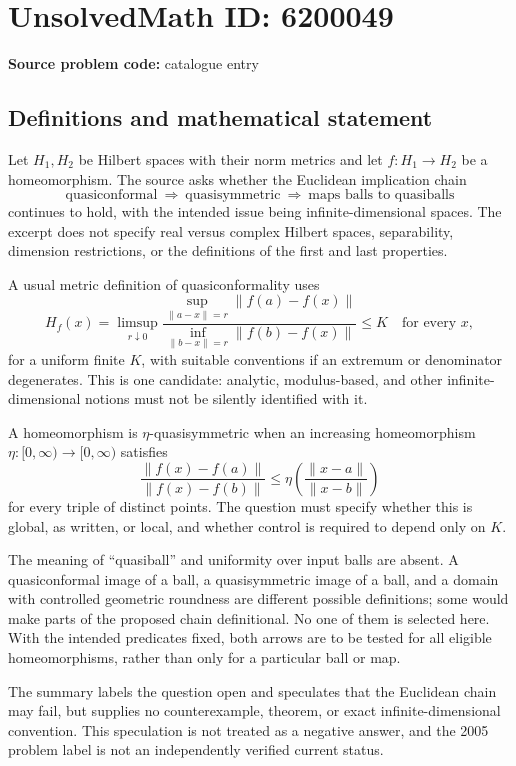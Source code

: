 \documentclass[11pt]{article}
\begin{document}
\section*{UnsolvedMath ID: 6200049}
\textbf{Source problem code:} catalogue entry
\subsection{Definitions and mathematical statement}
Let \(H_1,H_2\) be Hilbert spaces with their norm metrics and let \(f:H_1\to H_2\) be a homeomorphism. The source asks whether the Euclidean implication chain
\[
 \text{quasiconformal}\ \Longrightarrow\ \text{quasisymmetric}
 \ \Longrightarrow\ \text{maps balls to quasiballs}
\]
continues to hold, with the intended issue being infinite-dimensional spaces. The excerpt does not specify real versus complex Hilbert spaces, separability, dimension restrictions, or the definitions of the first and last properties.

A usual metric definition of quasiconformality uses
\[
 H_f(x)=\limsup_{r\downarrow0}
 \frac{\sup_{\|a-x\|=r}\|f(a)-f(x)\|}
 {\inf_{\|b-x\|=r}\|f(b)-f(x)\|}
 \le K\quad\text{for every }x,
\]
for a uniform finite \(K\), with suitable conventions if an extremum or denominator degenerates. This is one candidate: analytic, modulus-based, and other infinite-dimensional notions must not be silently identified with it.

A homeomorphism is \(\eta\)-quasisymmetric when an increasing homeomorphism \(\eta:[0,\infty)\to[0,\infty)\) satisfies
\[
 \frac{\|f(x)-f(a)\|}{\|f(x)-f(b)\|}
 \le\eta\left(\frac{\|x-a\|}{\|x-b\|}\right)
\]
for every triple of distinct points. The question must specify whether this is global, as written, or local, and whether control is required to depend only on \(K\).

The meaning of ``quasiball'' and uniformity over input balls are absent. A quasiconformal image of a ball, a quasisymmetric image of a ball, and a domain with controlled geometric roundness are different possible definitions; some would make parts of the proposed chain definitional. No one of them is selected here. With the intended predicates fixed, both arrows are to be tested for all eligible homeomorphisms, rather than only for a particular ball or map.

The summary labels the question open and speculates that the Euclidean chain may fail, but supplies no counterexample, theorem, or exact infinite-dimensional convention. This speculation is not treated as a negative answer, and the 2005 problem label is not an independently verified current status.
\end{document}
